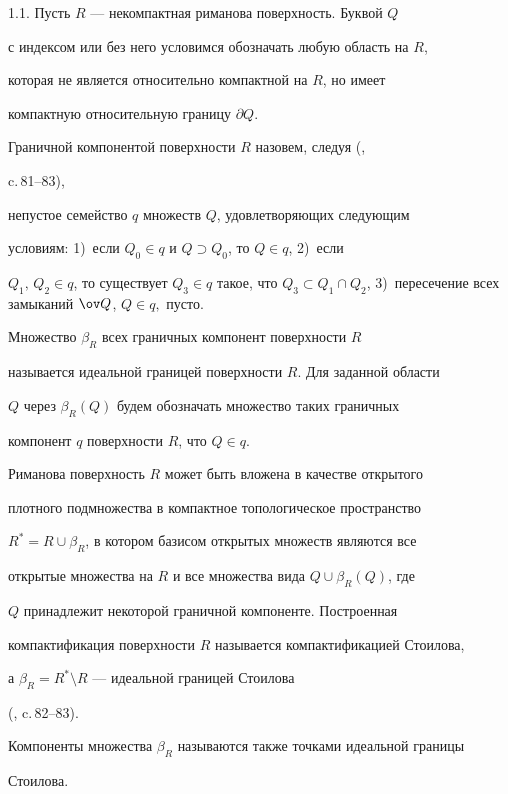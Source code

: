 1.1. Пусть $R$ --- некомпактная риманова поверхность. Буквой $Q$


с индексом или без него условимся обозначать любую область на $R$,


которая не является относительно компактной на $R$, но имеет


компактную относительную границу $\partial Q$.


Граничной компонентой поверхности $R$ назовем, следуя (\cite{A-S},


c.\,81--83),


непустое семейство $q$ множеств $Q$, удовлетворяющих следующим


условиям: 1)~если $Q_0\in q$ и $Q\supset Q_0$, то $Q\in q$, 2)~если


$Q_1,\,Q_2\in q$, то существует $Q_3\in q$ такое, что $Q_3\subset


Q_1\cap Q_2$, 3)~пересечение всех замыканий $\ov Q$, $Q\in q,$ пусто.





Множество $\beta_R$ всех граничных компонент поверхности $R$


называется идеальной границей поверхности $R$. Для заданной области


$Q$ через $\beta_R(Q)$ будем обозначать множество таких граничных


компонент $q$ поверхности $R$, что $Q\in q$.





Риманова поверхность $R$ может быть вложена в качестве открытого


плотного подмножества в компактное топологическое пространство


$R^*=R\cup \beta_R$, в котором базисом открытых множеств являются все


открытые множества на $R$ и все множества вида $Q\cup \beta_R(Q)$, где


$Q$ принадлежит некоторой граничной компоненте. Построенная


компактификация поверхности $R$ называется компактификацией Стоилова,


а $\beta_R =R^*\setminus R$ --- идеальной границей Стоилова


(\cite{A-S}, c.\,82--83).


Компоненты множества $\beta_R$ называются также точками идеальной границы


Стоилова.





